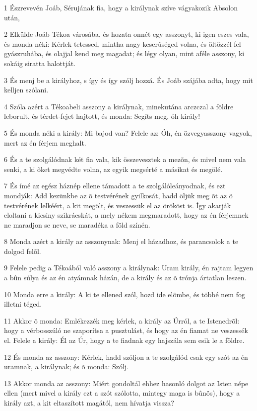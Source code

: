 \par 1 Észrevevén Joáb, Sérujának fia, hogy a királynak szíve vágyakozik Absolon után,
\par 2 Elkülde Joáb Tékoa városába, és hozata onnét egy asszonyt, ki igen eszes vala, és monda néki: Kérlek tetessed, mintha nagy keserûséged volna, és öltözzél fel gyászruhába, és olajjal kend meg magadat; és légy olyan, mint aféle asszony, ki sokáig siratta halottját.
\par 3 És menj be a királyhoz, s így és így szólj hozzá. És Joáb szájába adta, hogy mit kelljen szólani.
\par 4 Szóla azért a Tékoabeli asszony a királynak, minekutána arczczal a földre leborult, és térdet-fejet hajtott, és monda: Segíts meg, óh király!
\par 5 És monda néki a király: Mi bajod van? Felele az: Óh, én özvegyasszony vagyok, mert az én férjem meghalt.
\par 6 És a te szolgálódnak két fia vala, kik összevesztek a mezõn, és mivel nem vala senki, a ki õket megvédte volna, az egyik megsérté a másikat és megölé.
\par 7 És ímé az egész háznép ellene támadott a te szolgálóleányodnak, és ezt mondják: Add kezünkbe az õ testvérének gyilkosát, hadd öljük meg õt az õ testvérének lelkéért, a kit megölt, és veszessük el az örököst is. Így akarják eloltani a kicsiny szikrácskát, a mely nékem megmaradott, hogy az én férjemnek ne maradjon se neve, se maradéka a föld színén.
\par 8 Monda azért a király az asszonynak: Menj el házadhoz, és parancsolok a te dolgod felõl.
\par 9 Felele pedig a Tékoából való asszony a királynak: Uram király, én rajtam legyen a bûn súlya és az én atyámnak házán, de a király és az õ trónja ártatlan leszen.
\par 10 Monda erre a király: A ki te ellened szól, hozd ide elõmbe, és többé nem fog illetni téged.
\par 11 Akkor õ monda: Emlékezzék meg kérlek, a király az Úrról, a te Istenedrõl: hogy a vérbosszúló ne szaporítsa a pusztulást, és hogy az én fiamat ne veszessék el. Felele a király: Él az Úr, hogy a te fiadnak egy hajszála sem esik le a földre.
\par 12 És monda az asszony: Kérlek, hadd szóljon a te szolgálód csak egy szót az én uramnak, a királynak; és õ monda: Szólj.
\par 13 Akkor monda az asszony: Miért gondoltál ehhez hasonló dolgot az Isten népe ellen (mert mivel a király ezt a szót szólotta, mintegy maga is bûnös), hogy a király azt, a kit eltaszított magától, nem hívatja vissza?
